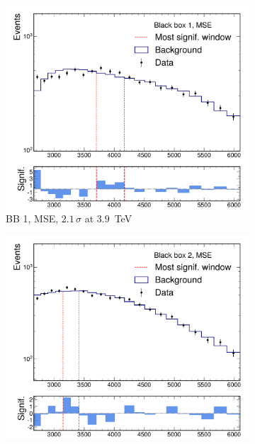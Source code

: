 \documentclass[letterpaper,11pt]{article}
\begin{document}
\begin{figure}[htpb]
    \centering
    \begin{subfigure}[b]{0.45\textwidth}
        \includegraphics[width=\textwidth]{figures/gae_mse/bb1_GNN_AE_EdgeConv_Finished_bumphunter.pdf}
        \caption*{BB 1, MSE, $2.1\,\sigma$ at $3.9$~TeV}
    \end{subfigure}
    \begin{subfigure}[b]{0.45\textwidth}
        \includegraphics[width=\textwidth]{figures/gae_mse/bb2_GNN_AE_EdgeConv_Finished_bumphunter.pdf}

\end{subfigure}
\end{figure}
\end{document}
